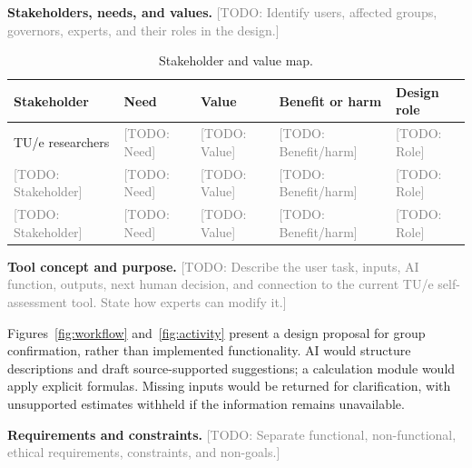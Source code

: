 \documentclass[11pt,a4paper]{article}
\newcommand{\placeholder}[1]{\textcolor{gray}{[TODO: #1]}}
\begin{document}
\textbf{Stakeholders, needs, and values.}
\placeholder{Identify users, affected groups, governors, experts, and their roles in the design.}

\begin{table}[htbp]
\centering
\caption{Stakeholder and value map.}
\small
\begin{tabularx}{\textwidth}{@{}p{}XXXp{}@{}}
\toprule
Stakeholder & Need & Value & Benefit or harm & Design role \\
\midrule
TU/e researchers & \placeholder{Need} & \placeholder{Value} & \placeholder{Benefit/harm} & \placeholder{Role} \\
\placeholder{Stakeholder} & \placeholder{Need} & \placeholder{Value} & \placeholder{Benefit/harm} & \placeholder{Role} \\
\placeholder{Stakeholder} & \placeholder{Need} & \placeholder{Value} & \placeholder{Benefit/harm} & \placeholder{Role} \\
\bottomrule
\end{tabularx}
\end{table}

\textbf{Tool concept and purpose.}
\placeholder{Describe the user task, inputs, AI function, outputs, next human decision, and connection to the current TU/e self-assessment tool. State how experts can modify it.}

Figures~\ref{fig:workflow} and~\ref{fig:activity} present a design proposal for group confirmation, rather than implemented functionality. AI would structure descriptions and draft source-supported suggestions; a calculation module would apply explicit formulas. Missing inputs would be returned for clarification, with unsupported estimates withheld if the information remains unavailable.


\FloatBarrier

\textbf{Requirements and constraints.}
\placeholder{Separate functional, non-functional, ethical requirements, constraints, and non-goals.}
\end{document}

